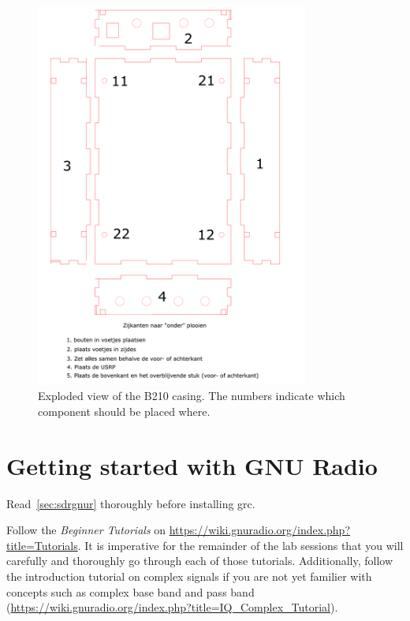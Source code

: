 \begin{figure}
    \centering
    \includegraphics[clip, trim=0mm 50mm 0mm 0mm, width=0.8\textwidth]{figs/assemble_case.pdf}\caption{Exploded view of the B210 casing. The numbers indicate which component should be placed where.}\label{fig:b210-case}
\end{figure}

\section{Getting started with GNU Radio}


Read~\cref{sec:sdrgnur} thoroughly before installing \gls{grc}.

Follow the \textit{Beginner Tutorials} on \url{https://wiki.gnuradio.org/index.php?title=Tutorials}. It is imperative for the remainder of the lab sessions that you will carefully and thoroughly go through each of those tutorials. Additionally, follow the introduction tutorial on complex signals if you are not yet familier with concepts such as complex base band and pass band (\url{https://wiki.gnuradio.org/index.php?title=IQ_Complex_Tutorial}). 



